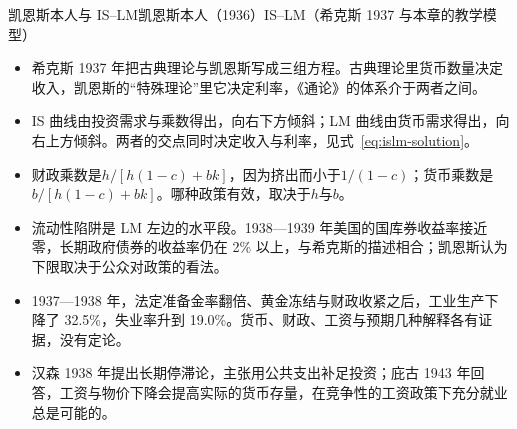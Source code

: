 \begin{compare}{凯恩斯本人与 IS–LM}{凯恩斯本人（1936）}{IS–LM（希克斯 1937 与本章的教学模型）}
\end{compare}

\begin{takeaways}
\begin{itemize}
\item 希克斯 1937 年把古典理论与凯恩斯写成三组方程。古典理论里货币数量决定收入，凯恩斯的“特殊理论”里它决定利率，《通论》的体系介于两者之间。
\item IS 曲线由投资需求与乘数得出，向右下方倾斜；LM 曲线由货币需求得出，向右上方倾斜。两者的交点同时决定收入与利率，见式~\eqref{eq:islm-solution}。
\item 财政乘数是$h/[h(1-c)+bk]$，因为挤出而小于$1/(1-c)$；货币乘数是$b/[h(1-c)+bk]$。哪种政策有效，取决于$h$与$b$。
\item 流动性陷阱是 LM 左边的水平段。1938—1939 年美国的国库券收益率接近零，长期政府债券的收益率仍在 2\% 以上，与希克斯的描述相合；凯恩斯认为下限取决于公众对政策的看法。
\item 1937—1938 年，法定准备金率翻倍、黄金冻结与财政收紧之后，工业生产下降了 32.5\%，失业率升到 19.0\%。货币、财政、工资与预期几种解释各有证据，没有定论。
\item 汉森 1938 年提出长期停滞论，主张用公共支出补足投资；庇古 1943 年回答，工资与物价下降会提高实际的货币存量，在竞争性的工资政策下充分就业总是可能的。
\end{itemize}
\end{takeaways}

